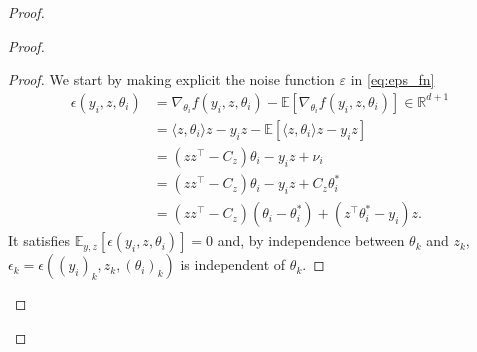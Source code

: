 \documentclass[11pt]{article}
\newcommand{\RR}{\mathbb{R}}
\newcommand{\EE}{\mathbb{E}}
\begin{document}
\begin{proof}
\begin{proof}
\begin{proof}
We start by making explicit the noise function $\varepsilon$ in \eqref{eq:eps_fn}
\begin{align*}
    \epsilon(y_i, z, \theta_i) &=  \nabla_{\theta_i} f(y_i,z,\theta_i) - \EE[\nabla_{\theta_i} f(y_i,z,\theta_i)] \in \RR^{d+1} \\
    &= \langle z, \theta_i \rangle z - y_i z - \EE[\langle z, \theta_i \rangle z - y_i z] \\
    &= (zz^\top  - C_z) \theta_i - y_i z + \nu_i \\
    &=  (zz^\top  - C_z) \theta_i - y_i z + C_z \theta^*_i  \\
    &= (zz^\top - C_z)(\theta_i - \theta^*_i) + (z^\top \theta^*_i- y_i)z .
\end{align*}
It satisfies $\mathbb{E}_{y,z}[\epsilon(y_i,z,\theta_i)] = 0$ and, by independence between $\theta_k$ and $z_k$,  $\epsilon_k = \epsilon((y_i)_k, z_k, (\theta_i)_k)$ is independent of $\theta_k$.


\end{proof}
\end{proof}
\end{proof}
\end{document}
